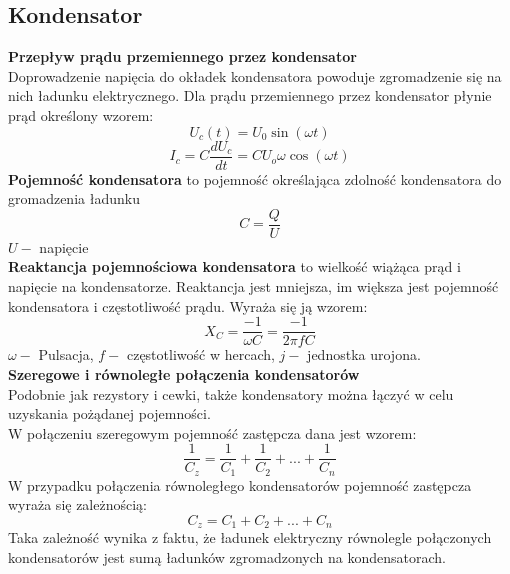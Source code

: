 \documentclass{article}
\begin{document}
\subsection{Kondensator}
\textbf{Przepływ prądu przemiennego przez kondensator}\\
Doprowadzenie napięcia do okładek kondensatora powoduje zgromadzenie się na nich ładunku elektrycznego. 
Dla prądu przemiennego przez kondensator płynie prąd określony wzorem:
$$U_c(t) = U_0\sin (\omega t)$$
$$I_c=C\frac{dU_c}{dt}=CU_o\omega \cos (\omega t)$$
\textbf{Pojemność kondensatora} to pojemność określająca zdolność kondensatora do gromadzenia ładunku $$C = \frac{Q}{U}$$
$U-$ napięcie\\
\textbf{Reaktancja pojemnościowa kondensatora} to wielkość wiążąca prąd i napięcie na kondensatorze. Reaktancja jest mniejsza, im większa jest pojemność kondensatora i częstotliwość prądu. Wyraża się ją wzorem:
$$X_C= \frac{-1}{\omega C}=\frac{-1}{2\pi fC}$$
$\omega -$ Pulsacja, $f -$ częstotliwość w hercach, $j-$ jednostka urojona.\\
\textbf{Szeregowe i równoległe połączenia kondensatorów}\\
Podobnie jak rezystory i cewki, także kondensatory można łączyć w celu uzyskania pożądanej pojemności.\\
W połączeniu szeregowym pojemność zastępcza dana jest wzorem:
$$\frac{1}{C_z}=\frac{1}{C_1}+\frac{1}{C_2}+...+\frac{1}{C_n}$$
W przypadku połączenia równoległego kondensatorów pojemność zastępcza wyraża się zależnością:
$$C_z = C_1 + C_2 + ...+C_n$$
Taka zależność wynika z faktu, że ładunek elektryczny równolegle połączonych kondensatorów jest sumą ładunków zgromadzonych na kondensatorach.
\end{document}
